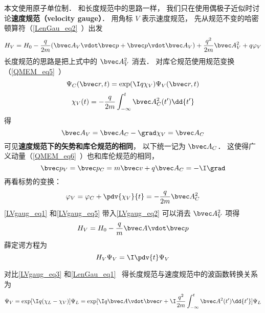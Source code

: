 

本文使用原子单位制． 和长度规范中的思路一样， 我们只在使用偶极子近似时讨论\textbf{速度规范（velocity gauge）}． 用角标 $V$ 表示速度规范， 先从规范不变的哈密顿算符（\autoref{LenGau_eq2}~）出发
\begin{equation}\label{LVgaug_eq2}
H_V = H_0 - \frac{q}{2m} (\bvec A_V \vdot \bvec p + \bvec p \vdot \bvec A_V)
+ \frac{q^2}{2m} \bvec A_V^2 + q \varphi_V
\end{equation}
长度规范的思路是把上式中的 $\bvec A_V^2$ 消去． 对库仑规范使用规范变换（\autoref{QMEM_eq5}~）
\begin{equation}\label{LVgaug_eq3}
\Psi_C(\bvec r, t) = \exp(\I q\chi_V)\Psi_V(\bvec r, t)
\end{equation}
\begin{equation}\label{LVgaug_eq4}
\chi_V(t) = -\frac{q}{2m} \int_{-\infty}^t \bvec A_C^2(t') \dd{t'}
\end{equation}
得
\begin{equation}\label{LVgaug_eq1}
\bvec A_V = \bvec A_C - \grad \chi_V = \bvec A_C
\end{equation}
可见\textbf{速度规范下的矢势和库仑规范的相同}， 以下统一记为 $\bvec A_C$． 这使得广义动量（\autoref{QMEM_eq6}~）也和库伦规范的相同， 
\begin{equation}
\bvec p_V = \bvec p_C =  m \bvec v + q\bvec A_{C} = -\I \grad
\end{equation}
再看标势的变换：
\begin{equation}\label{LVgaug_eq5}
\varphi_V = \varphi_C + \pdv{\chi_V}{t} = - \frac{q}{2m} \bvec A_C^2
\end{equation}
\autoref{LVgaug_eq1} 和\autoref{LVgaug_eq5} 带入\autoref{LVgaug_eq2} 可以消去 $\bvec A_V^2$ 项得
\begin{equation}
H_V = H_0 - \frac{q}{m} \bvec A \vdot \bvec p
\end{equation}
薛定谔方程为
\begin{equation}\label{LVgaug_eq7}
H_V \Psi_V = \I \pdv{t} \Psi_V
\end{equation}


对比\autoref{LVgaug_eq3} 和\autoref{LenGau_eq1}~ 得长度规范与速度规范中的波函数转换关系为
\begin{equation}\label{LVgaug_eq6}
\Psi_V = \exp[\I q(\chi_L - \chi_V)]\Psi_L = \exp[\I q \bvec A\vdot \bvec r + \I\frac{q^2}{2m}\int_{-\infty}^t \bvec A^2(t')\dd{t'}] \Psi_L
\end{equation}
